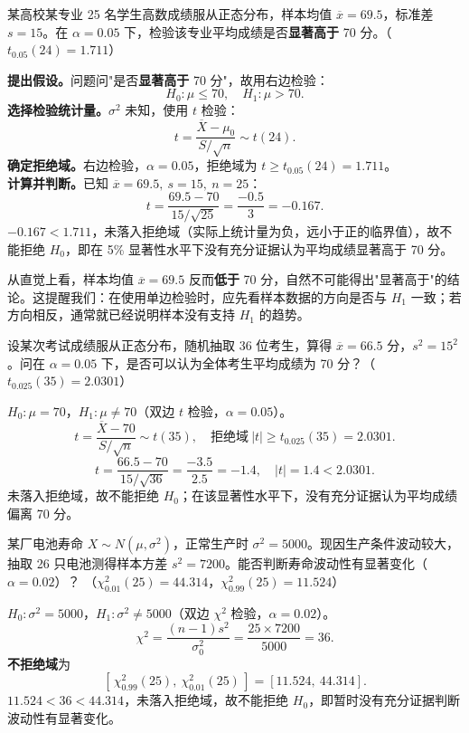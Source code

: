 ﻿\documentclass[lang=cn,11pt]{elegantbook}
\begin{document}
\begin{exercise}\label{exer:9-t-test-right}
某高校某专业 25 名学生高数成绩服从正态分布，样本均值 \(\overline{x}=69.5\)，标准差 \(s=15\)。在 \(\alpha=0.05\) 下，检验该专业平均成绩是否\textbf{显著高于} 70 分。（\(t_{0.05}(24)=1.711\)）
\end{exercise}
\begin{solution}
\textbf{提出假设。}问题问"是否\textbf{显著高于} 70 分"，故用右边检验：
\[
H_0\colon \mu \leq 70,\quad H_1\colon \mu > 70.
\]
\textbf{选择检验统计量。}\(\sigma^2\) 未知，使用 \(t\) 检验：
\[
t = \frac{\overline{X}-\mu_0}{S/\sqrt{n}} \sim t(24).
\]
\textbf{确定拒绝域。}右边检验，\(\alpha=0.05\)，拒绝域为 \(t \geq t_{0.05}(24)=1.711\)。\\
\textbf{计算并判断。}已知 \(\overline{x}=69.5,\ s=15,\ n=25\)：
\[
t = \frac{69.5-70}{15/\sqrt{25}} = \frac{-0.5}{3} = -0.167.
\]
\(-0.167 < 1.711\)，未落入拒绝域（实际上统计量为负，远小于正的临界值），故不能拒绝 \(H_0\)，即在 5\% 显著性水平下没有充分证据认为平均成绩显著高于 70 分。
\begin{note}
从直觉上看，样本均值 \(\overline{x}=69.5\) 反而\textbf{低于} 70 分，自然不可能得出"显著高于"的结论。这提醒我们：在使用单边检验时，应先看样本数据的方向是否与 \(H_1\) 一致；若方向相反，通常就已经说明样本没有支持 \(H_1\) 的趋势。
\end{note}
\end{solution}

\begin{exercise} \label{ex:ht_t_two}
设某次考试成绩服从正态分布，随机抽取 36 位考生，算得 \(\overline{x}=66.5\) 分，\(s^2=15^2\)。问在 \(\alpha=0.05\) 下，是否可以认为全体考生平均成绩为 70 分？（\(t_{0.025}(35)=2.0301\)）
\end{exercise}
\begin{solution}
\(H_0\colon\mu=70\)，\(H_1\colon\mu\neq70\)（双边 \(t\) 检验，\(\alpha=0.05\)）。
\[
t=\frac{\overline{X}-70}{S/\sqrt{n}}\sim t(35),\quad\text{拒绝域}\ |t|\geq t_{0.025}(35)=2.0301.
\]
\[
t=\frac{66.5-70}{15/\sqrt{36}}=\frac{-3.5}{2.5}=-1.4,\quad |t|=1.4<2.0301.
\]
未落入拒绝域，故不能拒绝 \(H_0\)；在该显著性水平下，没有充分证据认为平均成绩偏离 70 分。
\end{solution}

\begin{exercise} \label{ex:ht_chi2_battery}
某厂电池寿命 \(X\sim N(\mu,\sigma^2)\)，正常生产时 \(\sigma^2=5000\)。现因生产条件波动较大，抽取 26 只电池测得样本方差 \(s^2=7200\)。能否判断寿命波动性有显著变化（\(\alpha=0.02\)）？
（\(\chi^2_{0.01}(25)=44.314\)，\(\chi^2_{0.99}(25)=11.524\)）
\end{exercise}
\begin{solution}
\(H_0\colon\sigma^2=5000\)，\(H_1\colon\sigma^2\neq5000\)（双边 \(\chi^2\) 检验，\(\alpha=0.02\)）。
\[
\chi^2=\frac{(n-1)s^2}{\sigma_0^2}=\frac{25\times7200}{5000}=36.
\]
\textbf{不拒绝域}为
\[
[\,\chi^2_{0.99}(25),\ \chi^2_{0.01}(25)\,]=[11.524,\ 44.314].
\]
\(11.524<36<44.314\)，未落入拒绝域，故不能拒绝 \(H_0\)，即暂时没有充分证据判断波动性有显著变化。
\end{solution}
\end{document}
